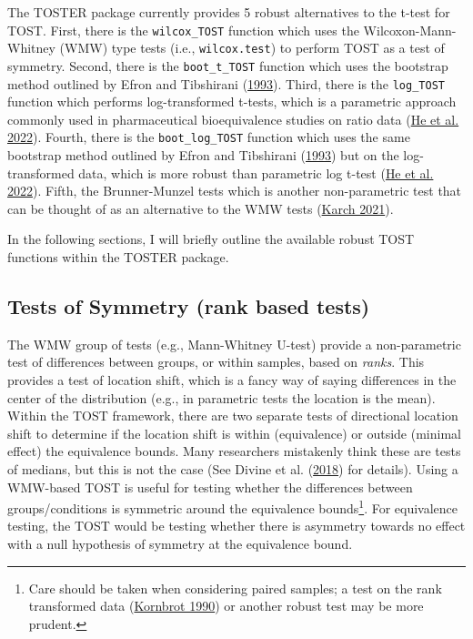 \documentclass[
]{interact}
\begin{document}
The TOSTER package currently provides 5 robust alternatives to the
t-test for TOST. First, there is the \texttt{wilcox\_TOST} function
which uses the Wilcoxon-Mann-Whitney (WMW) type tests (i.e.,
\texttt{wilcox.test}) to perform TOST as a test of symmetry. Second,
there is the \texttt{boot\_t\_TOST} function which uses the bootstrap
method outlined by Efron and Tibshirani
(\protect\hyperlink{ref-efron93}{1993}). Third, there is the
\texttt{log\_TOST} function which performs log-transformed t-tests,
which is a parametric approach commonly used in pharmaceutical
bioequivalence studies on ratio data (\protect\hyperlink{ref-he2022}{He
et al. 2022}). Fourth, there is the \texttt{boot\_log\_TOST} function
which uses the same bootstrap method outlined by Efron and Tibshirani
(\protect\hyperlink{ref-efron93}{1993}) but on the log-transformed data,
which is more robust than parametric log t-test
(\protect\hyperlink{ref-he2022}{He et al. 2022}). Fifth, the
Brunner-Munzel tests which is another non-parametric test that can be
thought of as an alternative to the WMW tests
(\protect\hyperlink{ref-karch2021}{Karch 2021}).

In the following sections, I will briefly outline the available robust
TOST functions within the TOSTER package.

\hypertarget{tests-of-symmetry-rank-based-tests}{%
\subsection{Tests of Symmetry (rank based
tests)}\label{tests-of-symmetry-rank-based-tests}}

The WMW group of tests (e.g., Mann-Whitney U-test) provide a
non-parametric test of differences between groups, or within samples,
based on \emph{ranks}. This provides a test of location shift, which is
a fancy way of saying differences in the center of the distribution
(e.g., in parametric tests the location is the mean). Within the TOST
framework, there are two separate tests of directional location shift to
determine if the location shift is within (equivalence) or outside
(minimal effect) the equivalence bounds. Many researchers mistakenly
think these are tests of medians, but this is not the case (See Divine
et al. (\protect\hyperlink{ref-median_test}{2018}) for details). Using a
WMW-based TOST is useful for testing whether the differences between
groups/conditions is symmetric around the equivalence bounds\footnote{Care
  should be taken when considering paired samples; a test on the rank
  transformed data (\protect\hyperlink{ref-kornbrot1990rank}{Kornbrot
  1990}) or another robust test may be more prudent.}. For equivalence
testing, the TOST would be testing whether there is asymmetry towards no
effect with a null hypothesis of symmetry at the equivalence bound.
\end{document}
